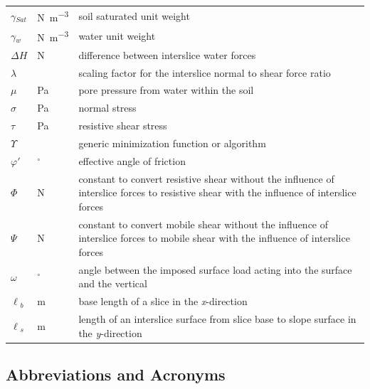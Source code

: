 \documentclass[12pt]{article}
\renewcommand{\arraystretch}{1}
\begin{document}
\begin{longtable*}{  l  l  p{8.5cm}  }
${\gamma{}_{Sat}}$ &  \si{\newton\per\cubic\meter} & soil saturated unit weight
\\
${\gamma{}_{w}}$ & \si{\newton\per\cubic\meter} & water unit weight
\\
$\Delta{}H$ & \si{\newton} & difference between interslice water forces
\\
$\lambda{}$ & & scaling factor for the interslice normal to shear force ratio
\\
$\mu{}$ &\si{\pascal} & pore pressure from water within the soil
\\
$\sigma{}$ & \si{\pascal} & normal stress
\\
$\tau{}$ & \si{\pascal} & resistive shear stress
\\
$\Upsilon{}$ & & generic minimization function or algorithm 
\\
$\varphi{}'$ & ${}^{\circ}$ & effective angle of friction
\\
$\Phi{}$ & \si{\newton} & constant to convert resistive shear without the 
influence of interslice forces to resistive shear with the influence of 
interslice 
forces
\\
$\Psi{}$ & \si{\newton} & constant to convert mobile shear without the 
influence of interslice forces to mobile shear with the influence of interslice 
forces
\\
$\omega{}$ & ${}^{\circ}$ & angle between the imposed surface load acting into 
the surface and the vertical
\\
${\ell{}_{b}}$ &  \si{\meter}& base length of a slice in the 
\textit{x}-direction
\\
${\ell{}_{s}}$ &  \si{\meter}& length of an interslice surface from slice base 
to slope surface in the \textit{y}-direction \\

\hline
\end{longtable*}
\renewcommand{\arraystretch}{1}


\subsection{Abbreviations and Acronyms}
\end{document}
